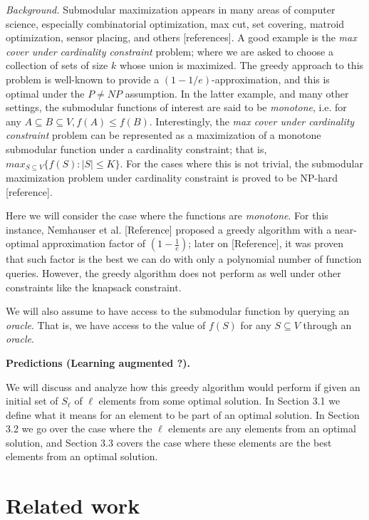 \documentclass{article} %
\begin{document}
\emph{Background.} Submodular maximization appears in many areas of computer science, especially combinatorial optimization, max cut, set covering, matroid optimization, sensor placing, and others [references]. A good example is the \emph{max cover under cardinality constraint} problem; where we are asked to choose a collection of sets of size $k$ whose union is maximized. The greedy approach to this problem is well-known to provide a $(1-1/e)$-approximation, and this is optimal under the $P \neq NP$ assumption. In the latter example, and many other settings, the submodular functions of interest are said to be \emph{monotone}, i.e. for any $A\subseteq B \subseteq V, f(A) \leq f(B)$. Interestingly, the \emph{max cover under cardinality constraint} problem can be represented as a maximization of a monotone submodular function under a cardinality constraint; that is, $max_{S \subseteq V} \{f(S) : |S| \leq K\}$. For the cases where this is not trivial, the submodular maximization problem under cardinality constraint is proved to be NP-hard [reference]. 

Here we will consider the case where the functions are \emph{monotone}. For this instance, Nemhauser et al. [Reference] proposed a greedy algorithm with a near-optimal approximation factor of $(1 -\frac{1}{e})$; later on [Reference], it was proven that such factor is the best we can do with only a polynomial number of function queries. However, the greedy algorithm does not perform as well under other constraints like the knapsack constraint.

We will also assume to have access to the submodular function by querying an \emph{oracle}. That is, we have access to the value of $f(S)$ for any $S \subseteq V$ through an \emph{oracle}.

\textbf{Predictions (Learning augmented ?).} 



\textbf{}

We will discuss and analyze how this greedy algorithm would perform if given an initial set of $S_{\ell}$ of $\ell$ elements from some optimal solution. In Section 3.1 we define what it means for an element to be part of an optimal solution. In Section 3.2 we go over the case where the $\ell$ elements are any elements from an optimal solution, and Section 3.3 covers the case where these elements are the best elements from an optimal solution. 

\section{Related work}
\end{document}
